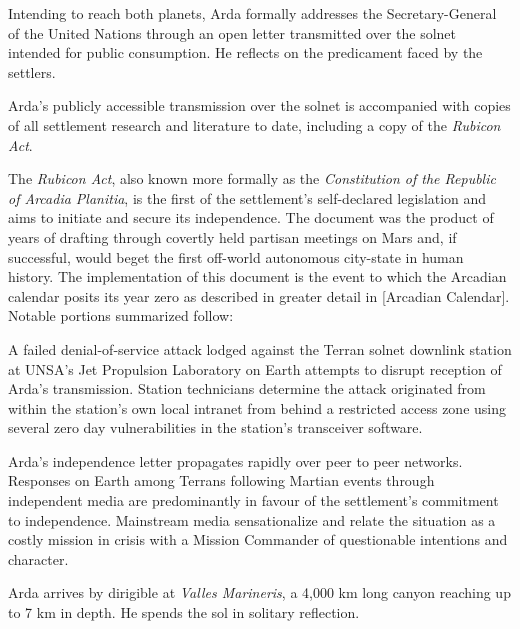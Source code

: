 Intending to reach both planets, Arda formally addresses the Secretary-General of the United Nations through an open letter transmitted over the solnet intended for public consumption. He reflects on the predicament faced by the settlers.

\startTimelineCorrespondenceDocument
    
\stopTimelineCorrespondenceDocument

Arda's publicly accessible transmission over the solnet is accompanied with copies of all settlement research and literature to date, including a copy of the {\it Rubicon Act}. 

The {\it Rubicon Act}, also known more formally as the {\it Constitution of the Republic of Arcadia Planitia}, is the first of the settlement's self-declared legislation and aims to initiate and secure its independence. The document was the product of years of drafting through covertly held partisan meetings on Mars and, if successful, would beget the first off-world autonomous city-state in human history. The implementation of this document is the event to which the Arcadian calendar posits its year zero as described in greater detail in [Arcadian Calendar]. Notable portions summarized follow:

\startTimelineGeneralDocument
    
\stopTimelineGeneralDocument

A failed denial-of-service attack lodged against the Terran solnet downlink station at UNSA's Jet Propulsion Laboratory on Earth attempts to disrupt reception of Arda's transmission. Station technicians determine the attack originated from within the station's own local intranet from behind a restricted access zone using several zero day vulnerabilities in the station's transceiver software.

Arda's independence letter propagates rapidly over peer to peer networks. Responses on Earth among Terrans following Martian events through independent media are predominantly in favour of the settlement's commitment to independence. Mainstream media sensationalize and relate the situation as a costly mission in crisis with a Mission Commander of questionable intentions and character.
\StopTimelineDate

Arda arrives by dirigible at {\it Valles Marineris}, a 4,000 km long canyon reaching up to 7 km in depth. He spends the sol in solitary reflection.

